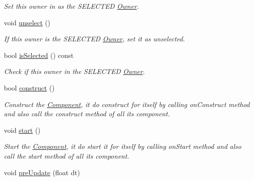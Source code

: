 \begin{DoxyCompactItemize}
\begin{DoxyCompactList}\small\item\em Set this owner in as the S\+E\+L\+E\+C\+T\+ED \hyperlink{class_i_dream_sky_1_1_component_1_1_owner}{Owner}. \end{DoxyCompactList}\item 
void \hyperlink{class_i_dream_sky_1_1_component_1_1_owner_a586f0cf237741a4d6e37c1f63872aefb}{unselect} ()\hypertarget{class_i_dream_sky_1_1_component_1_1_owner_a586f0cf237741a4d6e37c1f63872aefb}{}\label{class_i_dream_sky_1_1_component_1_1_owner_a586f0cf237741a4d6e37c1f63872aefb}

\begin{DoxyCompactList}\small\item\em If this owner is the S\+E\+L\+E\+C\+T\+ED \hyperlink{class_i_dream_sky_1_1_component_1_1_owner}{Owner}, set it as unselected. \end{DoxyCompactList}\item 
bool \hyperlink{class_i_dream_sky_1_1_component_1_1_owner_ad82a85171641ba638ac4334d5bc93cb4}{is\+Selected} () const \hypertarget{class_i_dream_sky_1_1_component_1_1_owner_ad82a85171641ba638ac4334d5bc93cb4}{}\label{class_i_dream_sky_1_1_component_1_1_owner_ad82a85171641ba638ac4334d5bc93cb4}

\begin{DoxyCompactList}\small\item\em Check if this owner in the S\+E\+L\+E\+C\+T\+ED \hyperlink{class_i_dream_sky_1_1_component_1_1_owner}{Owner}. \end{DoxyCompactList}\item 
bool \hyperlink{class_i_dream_sky_1_1_component_1_1_owner_a6878b12a1f8e8119da43305d175bf522}{construct} ()
\begin{DoxyCompactList}\small\item\em Construct the \hyperlink{class_i_dream_sky_1_1_component}{Component}, it do construct for itself by calling on\+Construct method and also call the construct method of all its component. \end{DoxyCompactList}\item 
void \hyperlink{class_i_dream_sky_1_1_component_1_1_owner_a40b2d7b5072754e7517251d52d09c8f2}{start} ()\hypertarget{class_i_dream_sky_1_1_component_1_1_owner_a40b2d7b5072754e7517251d52d09c8f2}{}\label{class_i_dream_sky_1_1_component_1_1_owner_a40b2d7b5072754e7517251d52d09c8f2}

\begin{DoxyCompactList}\small\item\em Start the \hyperlink{class_i_dream_sky_1_1_component}{Component}, it do start it for itself by calling on\+Start method and also call the start method of all its component. \end{DoxyCompactList}\item 
void \hyperlink{class_i_dream_sky_1_1_component_1_1_owner_aae6b25b4cfa051ad7a76ad5ac59f08c7}{pre\+Update} (float dt)\hypertarget{class_i_dream_sky_1_1_component_1_1_owner_aae6b25b4cfa051ad7a76ad5ac59f08c7}{}\label{class_i_dream_sky_1_1_component_1_1_owner_aae6b25b4cfa051ad7a76ad5ac59f08c7}


\end{DoxyCompactItemize}
